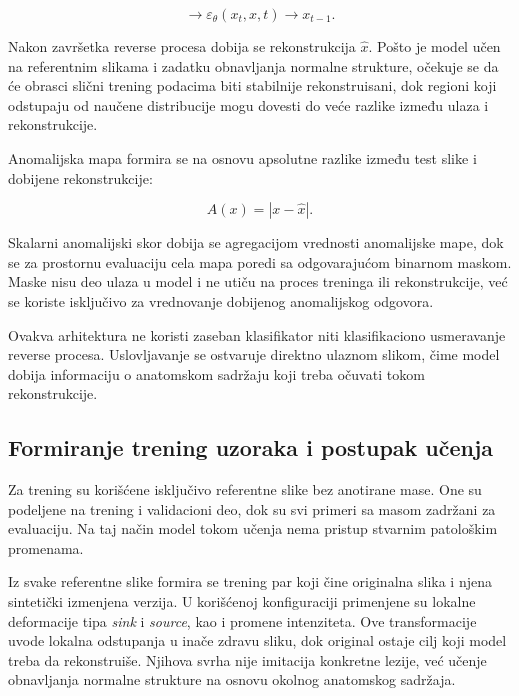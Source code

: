 \documentclass[10pt]{article}
\begin{document}
	\begin{equation}
		[x_t,x]
		\longrightarrow
		\varepsilon_{\theta}(x_t,x,t)
		\longrightarrow
		x_{t-1}.
	\end{equation}
	
	Nakon završetka reverse procesa dobija se rekonstrukcija $\hat{x}$. Pošto je model učen na referentnim slikama i zadatku obnavljanja normalne strukture, očekuje se da će obrasci slični trening podacima biti stabilnije rekonstruisani, dok regioni koji odstupaju od naučene distribucije mogu dovesti do veće razlike između ulaza i rekonstrukcije.
	
	Anomalijska mapa formira se na osnovu apsolutne razlike između test slike i dobijene rekonstrukcije:
	
	\begin{equation}
		A(x)=|x-\hat{x}|.
	\end{equation}
	
	Skalarni anomalijski skor dobija se agregacijom vrednosti anomalijske mape, dok se za prostornu evaluaciju cela mapa poredi sa odgovarajućom binarnom maskom. Maske nisu deo ulaza u model i ne utiču na proces treninga ili rekonstrukcije, već se koriste isključivo za vrednovanje dobijenog anomalijskog odgovora.
	
	Ovakva arhitektura ne koristi zaseban klasifikator niti klasifikaciono usmeravanje reverse procesa. Uslovljavanje se ostvaruje direktno ulaznom slikom, čime model dobija informaciju o anatomskom sadržaju koji treba očuvati tokom rekonstrukcije.
	
	\subsection{Formiranje trening uzoraka i postupak učenja}
	
	Za trening su korišćene isključivo referentne slike bez anotirane mase. One su podeljene na trening i validacioni deo, dok su svi primeri sa masom zadržani za evaluaciju. Na taj način model tokom učenja nema pristup stvarnim patološkim promenama.
	
	Iz svake referentne slike formira se trening par koji čine originalna slika i njena sintetički izmenjena verzija. U korišćenoj konfiguraciji primenjene su lokalne deformacije tipa \textit{sink} i \textit{source}, kao i promene intenziteta. Ove transformacije uvode lokalna odstupanja u inače zdravu sliku, dok original ostaje cilj koji model treba da rekonstruiše. Njihova svrha nije imitacija konkretne lezije, već učenje obnavljanja normalne strukture na osnovu okolnog anatomskog sadržaja.
	
\end{document}
